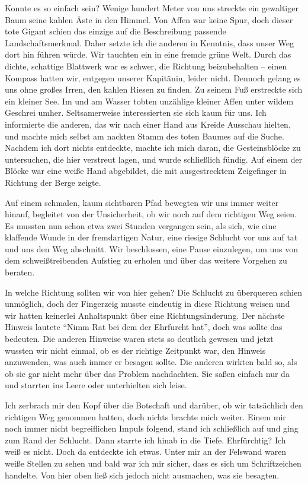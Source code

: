 Konnte es so einfach sein? Wenige hundert Meter von uns streckte ein gewaltiger Baum seine kahlen Äste in den Himmel. Von Affen war keine Spur, doch dieser tote Gigant schien das einzige auf die Beschreibung passende Landschaftsmerkmal. Daher setzte ich die anderen in Kenntnis, dass unser Weg dort hin führen würde. Wir tauchten ein in eine fremde grüne Welt. Durch das dichte, schattige Blattwerk war es schwer, die Richtung beizubehalten -- einen Kompass hatten wir, entgegen unserer Kapitänin, leider nicht. Dennoch gelang es uns ohne großes Irren, den kahlen Riesen zu finden. Zu seinem Fuß erstreckte sich ein kleiner See. Im und am Wasser tobten unzählige kleiner Affen unter wildem Geschrei umher. Seltsamerweise interessierten sie sich kaum für uns. Ich informierte die anderen, das wir nach einer Hand aus Kreide Ausschau hielten, und machte mich selbst am nackten Stamm des toten Baumes auf die Suche. Nachdem ich dort nichts entdeckte, machte ich mich daran, die Gesteinsblöcke zu untersuchen, die hier verstreut lagen, und wurde schließlich fündig. Auf einem der Blöcke war eine weiße Hand abgebildet, die mit ausgestrecktem Zeigefinger in Richtung der Berge zeigte. 

Auf einem schmalen, kaum sichtbaren Pfad bewegten wir uns immer weiter hinauf, begleitet von der Unsicherheit, ob wir noch auf dem richtigen Weg seien. Es mussten nun schon etwa zwei Stunden vergangen sein, als sich, wie eine klaffende Wunde in der fremdartigen Natur, eine riesige Schlucht vor uns auf tat und uns den Weg abschnitt. Wir beschlossen, eine Pause einzulegen, um uns von dem schweißtreibenden Aufstieg zu erholen und über das weitere Vorgehen zu beraten.

In welche Richtung sollten wir von hier gehen? Die Schlucht zu überqueren schien unmöglich, doch der Fingerzeig musste eindeutig in diese Richtung weisen und wir hatten keinerlei Anhaltspunkt über eine Richtungsänderung. Der nächste Hinweis lautete \enquote{Nimm Rat bei dem der Ehrfurcht hat}, doch was sollte das bedeuten. Die anderen Hinweise waren stets so deutlich gewesen und jetzt wussten wir nicht einmal, ob es der richtige Zeitpunkt war, den Hinweis anzuwenden, was auch immer er besagen sollte. Die anderen wirkten bald so, als ob sie gar nicht mehr über das Problem nachdachten. Sie saßen einfach nur da und starrten ins Leere oder unterhielten sich leise.

Ich zerbrach mir den Kopf über die Botschaft und darüber, ob wir tatsächlich den richtigen Weg genommen hatten, doch nichts brachte mich weiter. Einem mir noch immer nicht begreiflichen Impuls folgend, stand ich schließlich auf und ging zum Rand der Schlucht. Dann starrte ich hinab in die Tiefe. Ehrfürchtig? Ich weiß es nicht. Doch da entdeckte ich etwas. Unter mir an der Felswand waren weiße Stellen zu sehen und bald war ich mir sicher, dass es sich um Schriftzeichen handelte. Von hier oben ließ sich jedoch nicht ausmachen, was sie besagten.

